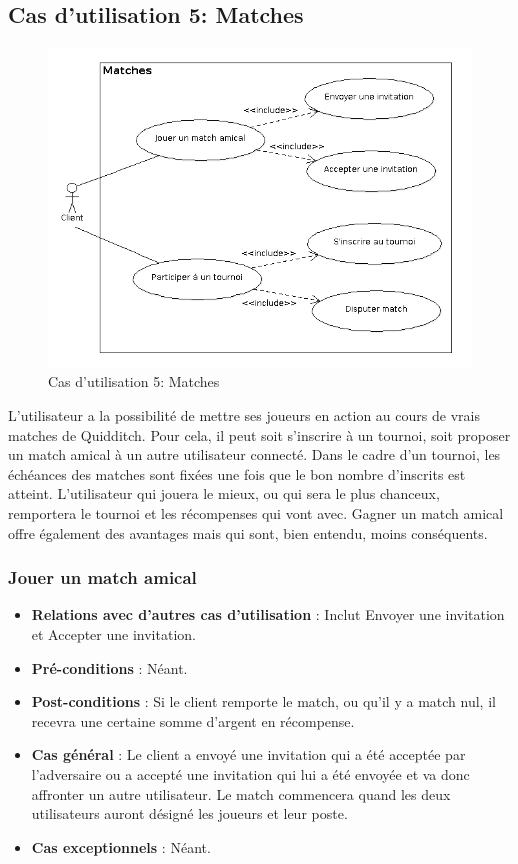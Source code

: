 \documentclass[a4paper,titlepage]{scrreprt}
\begin{document}
  \subsection{Cas d'utilisation 5: Matches}
  \begin{figure}[H]
    \center
    \includegraphics[scale=0.5]{uml/useCaseView/Matches.png}
    \caption{Cas d'utilisation 5: Matches}
  \end{figure}  
    L'utilisateur a la possibilité de mettre ses joueurs en action au cours de vrais matches de Quidditch. Pour cela, il peut soit s'inscrire à un tournoi, soit proposer un match amical à un autre utilisateur connecté. Dans le cadre d'un tournoi, les échéances des matches sont fixées une fois que le bon nombre d'inscrits est atteint. L'utilisateur qui jouera le mieux, ou qui sera le plus chanceux, remportera le tournoi et les récompenses qui vont avec. Gagner un match amical offre également des avantages mais qui sont, bien entendu, moins conséquents.

    \subsubsection{Jouer un match amical}
      \begin{itemize}
        \item \textbf{Relations avec d'autres cas d'utilisation}  : Inclut Envoyer une invitation et Accepter une invitation.
        \item \textbf{Pré-conditions} : Néant.
        \item \textbf{Post-conditions} : Si le client remporte le match, ou qu'il y a match nul, il recevra une certaine somme d'argent en récompense.
        \item \textbf{Cas général} : Le client a envoyé une invitation qui a été acceptée par l'adversaire ou a accepté une invitation qui lui a été envoyée et va donc affronter un autre utilisateur. Le match commencera quand les deux utilisateurs auront désigné les joueurs et leur poste.
        \item \textbf{Cas exceptionnels} : Néant.
      \end{itemize}
\end{document}
